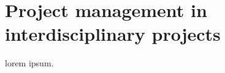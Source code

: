 \chapter{Project management in interdisciplinary projects}
\label{ch:ch2_ProjectManagement}

lorem ipsum.